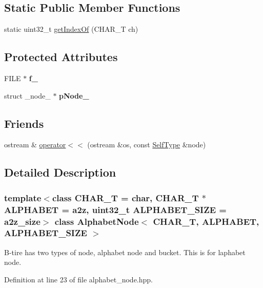 \subsection*{Static Public Member Functions}
\begin{CompactItemize}
\item 
static uint32\_\-t \hyperlink{classAlphabetNode_70a1bce2cd115da3c90b11034f74f8c1}{getIndexOf} (CHAR\_\-T ch)
\end{CompactItemize}
\subsection*{Protected Attributes}
\begin{CompactItemize}
\item 
\hypertarget{classAlphabetNode_31d36c4238bf52a4903b2d4759c86b1c}{
FILE $\ast$ \textbf{f\_\-}}
\label{classAlphabetNode_31d36c4238bf52a4903b2d4759c86b1c}

\item 
\hypertarget{classAlphabetNode_1d4356b5ee64c1d65c1807cbfb11d8a1}{
struct \_\-node\_\- $\ast$ \textbf{pNode\_\-}}
\label{classAlphabetNode_1d4356b5ee64c1d65c1807cbfb11d8a1}

\end{CompactItemize}
\subsection*{Friends}
\begin{CompactItemize}
\item 
ostream \& \hyperlink{classAlphabetNode_d6b3ef7ecb2e9975d8022514f68f74f5}{operator$<$$<$} (ostream \&os, const \hyperlink{classAlphabetNode}{SelfType} \&node)
\end{CompactItemize}


\subsection{Detailed Description}
\subsubsection*{template$<$class CHAR\_\-T = char, CHAR\_\-T $\ast$ ALPHABET = a2z, uint32\_\-t ALPHABET\_\-SIZE = a2z\_\-size$>$ class AlphabetNode$<$ CHAR\_\-T, ALPHABET, ALPHABET\_\-SIZE $>$}

B-tire has two types of node, alphabet node and bucket. This is for laphabet node. 

Definition at line 23 of file alphabet\_\-node.hpp.

